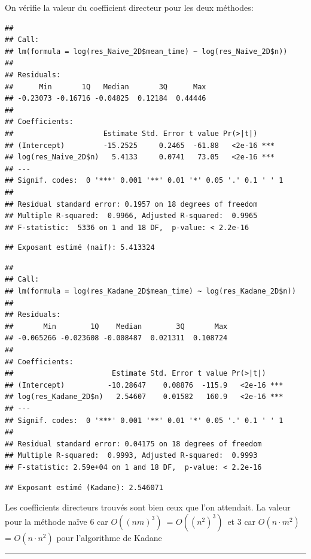 \documentclass[
]{article}
\begin{document}
On vérifie la valeur du coefficient directeur pour les deux méthodes:

\begin{verbatim}
## 
## Call:
## lm(formula = log(res_Naive_2D$mean_time) ~ log(res_Naive_2D$n))
## 
## Residuals:
##      Min       1Q   Median       3Q      Max 
## -0.23073 -0.16716 -0.04825  0.12184  0.44446 
## 
## Coefficients:
##                     Estimate Std. Error t value Pr(>|t|)    
## (Intercept)         -15.2525     0.2465  -61.88   <2e-16 ***
## log(res_Naive_2D$n)   5.4133     0.0741   73.05   <2e-16 ***
## ---
## Signif. codes:  0 '***' 0.001 '**' 0.01 '*' 0.05 '.' 0.1 ' ' 1
## 
## Residual standard error: 0.1957 on 18 degrees of freedom
## Multiple R-squared:  0.9966, Adjusted R-squared:  0.9965 
## F-statistic:  5336 on 1 and 18 DF,  p-value: < 2.2e-16
\end{verbatim}

\begin{verbatim}
## Exposant estimé (naïf): 5.413324
\end{verbatim}

\begin{verbatim}
## 
## Call:
## lm(formula = log(res_Kadane_2D$mean_time) ~ log(res_Kadane_2D$n))
## 
## Residuals:
##       Min        1Q    Median        3Q       Max 
## -0.065266 -0.023608 -0.008487  0.021311  0.108724 
## 
## Coefficients:
##                       Estimate Std. Error t value Pr(>|t|)    
## (Intercept)          -10.28647    0.08876  -115.9   <2e-16 ***
## log(res_Kadane_2D$n)   2.54607    0.01582   160.9   <2e-16 ***
## ---
## Signif. codes:  0 '***' 0.001 '**' 0.01 '*' 0.05 '.' 0.1 ' ' 1
## 
## Residual standard error: 0.04175 on 18 degrees of freedom
## Multiple R-squared:  0.9993, Adjusted R-squared:  0.9993 
## F-statistic: 2.59e+04 on 1 and 18 DF,  p-value: < 2.2e-16
\end{verbatim}

\begin{verbatim}
## Exposant estimé (Kadane): 2.546071
\end{verbatim}

Les coefficients directeurs trouvés sont bien ceux que l'on attendait.
La valeur pour la méthode naïve 6 car \(O\left((nm)^3\right)\)~=
\(O\left((n^2)^3\right)\)~et 3 car \(O(n \cdot m^2)\) =
\(O(n \cdot n^2)\) pour l'algorithme de Kadane

\begin{center}\rule{0.5\linewidth}{0.5pt}\end{center}
\end{document}
